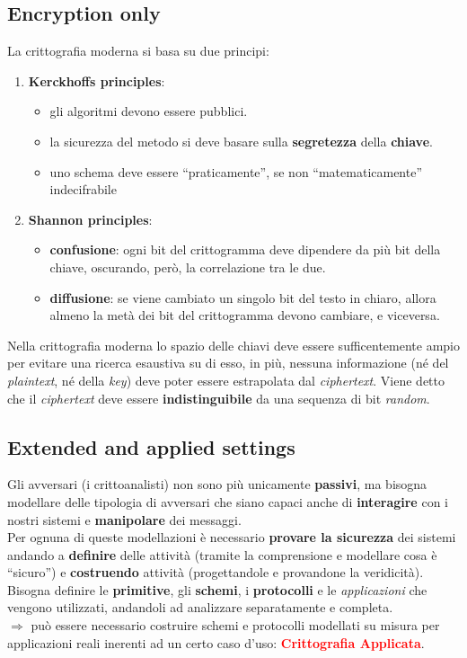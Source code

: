 \subsection{Encryption only}
La crittografia moderna si basa su due principi:
\begin{enumerate}[nosep]
    \item \textbf{Kerckhoffs principles}:
    \begin{itemize}[nosep]
        \item gli algoritmi devono essere pubblici.
        \item la sicurezza del metodo si deve basare sulla \textbf{segretezza} della \textbf{chiave}.
        \item uno schema deve essere ``praticamente'', se non ``matematicamente'' indecifrabile
    \end{itemize}
    \item \textbf{Shannon principles}:
    \begin{itemize}[nosep]
        \item \textbf{confusione}: ogni bit del crittogramma deve dipendere da più bit della chiave, oscurando, però, la correlazione tra le due.
        \item \textbf{diffusione}: se viene cambiato un singolo bit del testo in chiaro, allora almeno la metà dei bit del crittogramma devono cambiare, e viceversa.
    \end{itemize}
\end{enumerate}
Nella crittografia moderna lo spazio delle chiavi deve essere sufficentemente ampio per evitare una ricerca esaustiva su di esso, in più, nessuna informazione (né del \textit{plaintext}, né della \textit{key}) deve poter essere estrapolata dal \textit{ciphertext}. Viene detto che il \textit{ciphertext} deve essere \textbf{indistinguibile} da una sequenza di bit \textit{random}.

\subsection{Extended and applied settings}
Gli avversari (i crittoanalisti) non sono più unicamente \textbf{passivi}, ma bisogna modellare delle tipologia di avversari che siano capaci anche di \textbf{interagire} con i nostri sistemi e \textbf{manipolare} dei messaggi. \\
Per ognuna di queste modellazioni è necessario \textbf{provare la sicurezza} dei sistemi andando a \textbf{definire} delle attività (tramite la comprensione e modellare cosa è ``sicuro'') e \textbf{costruendo} attività (progettandole e provandone la veridicità). \\ \newline
Bisogna definire le \textbf{primitive}, gli \textbf{schemi}, i \textbf{protocolli} e le \textit{applicazioni} che vengono utilizzati, andandoli ad analizzare separatamente e completa. \\
$\Rightarrow$ può essere necessario costruire schemi e protocolli modellati su misura per applicazioni reali inerenti ad un certo caso d'uso: \textcolor{red}{\textbf{Crittografia Applicata}}.

